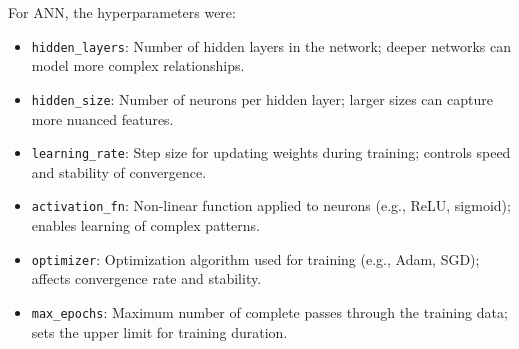 For ANN, the hyperparameters were:

\begin{itemize}
	\item \texttt{hidden\_layers}: Number of hidden layers in the network; deeper
	      networks can model more complex relationships.
	\item \texttt{hidden\_size}: Number of neurons per hidden layer; larger sizes
	      can capture more nuanced features.
	\item \texttt{learning\_rate}: Step size for updating weights during
	      training; controls speed and stability of convergence.
	\item \texttt{activation\_fn}: Non-linear function applied to neurons (e.g.,
	      ReLU, sigmoid); enables learning of complex patterns.
	\item \texttt{optimizer}: Optimization algorithm used for training (e.g.,
	      Adam, SGD); affects convergence rate and stability.
	\item \texttt{max\_epochs}: Maximum number of complete passes through the
	      training data; sets the upper limit for training duration.
\end{itemize}

